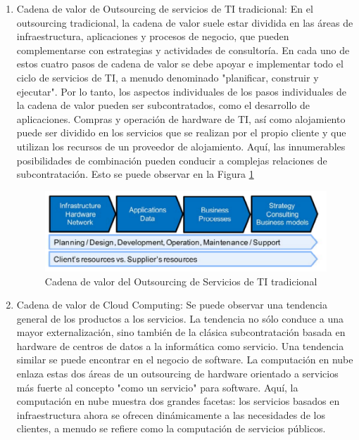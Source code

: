 \documentclass[a4paper, 12pt]{report}
\begin{document}
	\begin{enumerate}[label=\alph*)]
		\item{Cadena de valor de Outsourcing de servicios de TI tradicional: }
			En el outsourcing tradicional, la cadena de valor suele estar dividida en las áreas de infraestructura, aplicaciones y procesos de negocio, que pueden complementarse con estrategias y actividades de consultoría. En cada uno de estos cuatro pasos de cadena de valor se debe apoyar e implementar todo el ciclo de servicios de TI, a menudo denominado "planificar, construir y ejecutar". Por lo tanto, los aspectos individuales de los pasos individuales de la cadena de valor pueden ser subcontratados, como el desarrollo de aplicaciones. Compras y operación de hardware de TI, así como alojamiento puede ser dividido en los servicios que se realizan por el propio cliente y que utilizan los recursos de un proveedor de alojamiento. Aquí, las innumerables posibilidades de combinación pueden conducir a complejas relaciones de subcontratación. Esto se puede observar en la Figura \ref{fig:cadenaTradicional}
\begin{figure}[ht]
	\begin{center}
		\includegraphics[width=1\textwidth]{cadenaTradicional}
		\caption{Cadena de valor del Outsourcing de Servicios de TI tradicional}
		\label{fig:cadenaTradicional}
	\end{center}
\end{figure}
		\item{Cadena de valor de Cloud Computing: }
		Se puede observar una tendencia general de los productos a los servicios. La tendencia no sólo conduce a una mayor externalización, sino también de la clásica subcontratación basada en hardware de centros de datos a la informática como servicio. Una tendencia similar se puede encontrar en el negocio de software. La computación en nube enlaza estas dos áreas de un outsourcing de hardware orientado a servicios más fuerte al concepto "como un servicio" para software. Aquí, la computación en nube muestra dos grandes facetas: los servicios basados en infraestructura ahora se ofrecen dinámicamente a las necesidades de los clientes, a menudo se refiere como la computación de servicios públicos.

\end{enumerate}
\end{document}
